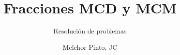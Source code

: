 \documentclass{guia}
\title{Fracciones MCD y MCM}
\subtitle{Resolución de problemas}
\author{Melchor Pinto, JC}
\begin{document}
%
\begin{questions}
\questionboxed{}
\end{questions}
\end{document}
